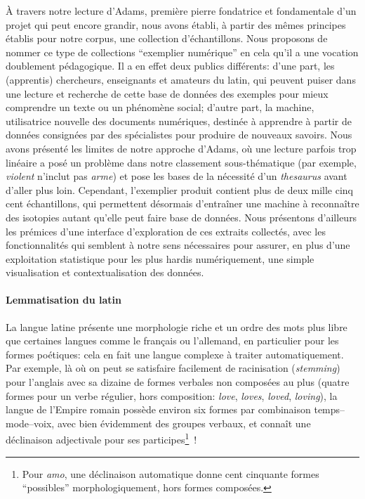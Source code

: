À travers notre lecture d'Adams, première pierre fondatrice et fondamentale d'un projet qui peut encore grandir, nous avons établi, à partir des mêmes principes établis pour notre corpus, une collection d'échantillons. Nous proposons de nommer ce type de collections \enquote{exemplier numérique} en cela qu'il a une vocation doublement pédagogique. Il a en effet deux publics différents: d'une part, les (apprentis) chercheurs, enseignants et amateurs du latin, qui peuvent puiser dans une lecture et recherche de cette base de données des exemples pour mieux comprendre un texte ou un phénomène social; d'autre part, la machine, utilisatrice nouvelle des documents numériques, destinée à apprendre à partir de données consignées par des spécialistes pour produire de nouveaux savoirs. Nous avons présenté les limites de notre approche d'Adams, où une lecture parfois trop linéaire a posé un problème dans notre classement sous-thématique (par exemple, \textit{violent} n'inclut pas \textit{arme}) et pose les bases de la nécessité d'un \textit{thesaurus} avant d'aller plus loin. Cependant, l'exemplier produit contient plus de deux mille cinq cent échantillons, qui permettent désormais d'entraîner une machine à reconnaître des isotopies autant qu'elle peut faire base de données. Nous présentons d'ailleurs les prémices d'une interface d'exploration de ces extraits collectés, avec les fonctionnalités qui semblent à notre sens nécessaires pour assurer, en plus d'une exploitation statistique pour les plus hardis numériquement, une simple visualisation et contextualisation des données.

\paragraph{Lemmatisation du latin}

La langue latine présente une morphologie riche et un ordre des mots plus libre que certaines langues comme le français ou l'allemand, en particulier pour les formes poétiques: cela en fait une langue complexe à traiter automatiquement. Par exemple, là où on peut se satisfaire facilement de racinisation (\textit{stemming}) pour l'anglais avec sa dizaine de formes verbales non composées au plus 
(quatre formes pour un verbe régulier, hors composition: \textit{love}, \textit{loves}, \textit{loved}, \textit{loving}), la langue de l'Empire romain possède environ six formes par combinaison temps--mode--voix, avec bien évidemment des groupes verbaux, et connaît une déclinaison adjectivale pour ses participes\footnote{Pour \textit{amo}, une déclinaison automatique donne cent cinquante formes \enquote{possibles} morphologiquement, hors formes composées.}~! 

